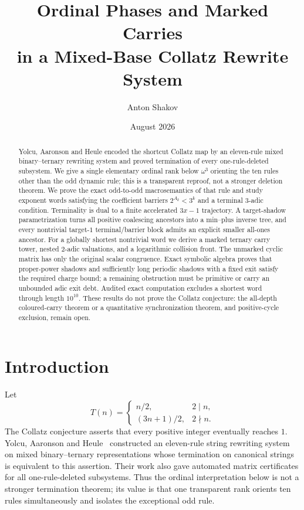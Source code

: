 \documentclass[11pt,reqno]{amsart}
\title[Ordinal phases and marked carries]{Ordinal Phases and Marked Carries\\in a Mixed-Base Collatz Rewrite System}
\author{Anton Shakov}
\date{August 2026}
\theoremstyle{remark}
\begin{document}
\begin{abstract}
Yolcu, Aaronson and Heule encoded the shortcut Collatz map by an eleven-rule
mixed binary--ternary rewriting system and proved termination of every
one-rule-deleted subsystem.  We give a single elementary ordinal rank below
$\omega^3$ orienting the ten rules other than the odd dynamic rule; this is a
transparent reproof, not a stronger deletion theorem.  We prove the exact
odd-to-odd macrosemantics of that rule and study exponent words satisfying the
coefficient barriers $2^{A_k}<3^k$ and a terminal $3$-adic condition.
Terminality is dual to a finite accelerated $3x-1$ trajectory.  A target-shadow
parametrization turns all positive coalescing ancestors into a min--plus
inverse tree, and every nontrivial target-$1$ terminal/barrier block admits an
explicit smaller all-ones ancestor.  For a globally shortest nontrivial word
we derive a marked ternary carry tower, nested $2$-adic valuations, and a
logarithmic collision front.  The unmarked cyclic matrix has only the original
scalar congruence.  Exact symbolic algebra proves that proper-power shadows
and sufficiently long periodic shadows with a fixed exit satisfy the required
charge bound; a remaining obstruction must be primitive or carry an unbounded
adic exit debt.  Audited exact computation excludes a shortest word through
length $10^{10}$.  These results do not prove the Collatz conjecture: the
all-depth coloured-carry theorem or a quantitative synchronization theorem,
and positive-cycle exclusion, remain open.
\end{abstract}

\maketitle

\section{Introduction}

Let
\[
 T(n)=\begin{cases}n/2,&2\mid n,\\(3n+1)/2,&2\nmid n.\end{cases}
\]
The Collatz conjecture asserts that every positive integer eventually reaches
$1$.  Yolcu, Aaronson and Heule~\cite{YAH} constructed an eleven-rule string
rewriting system on mixed binary--ternary representations whose termination
on canonical strings is equivalent to this assertion.  Their work also gave
automated matrix certificates for all one-rule-deleted subsystems.  Thus the
ordinal interpretation below is not a stronger termination theorem; its value
is that one transparent rank orients ten rules simultaneously and isolates the
exceptional odd rule.
\end{document}
